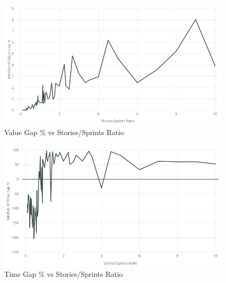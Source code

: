\begin{figure}[h!]
    \centering
    \includegraphics[width=\textwidth]{Figures/Results/annealing_value_gap_stories_sprints.png}
    \caption{Value Gap \% vs Stories/Sprints Ratio}
    \label{fig:value_gap_vs_stories_sprints}
\end{figure}

\begin{figure}[h!]
    \centering
    \includegraphics[width=\textwidth]{Figures/Results/annealing_time_gap_stories_sprints.png}
    \caption{Time Gap \% vs Stories/Sprints Ratio}
    \label{fig:time_gap_vs_stories_sprints}
\end{figure}